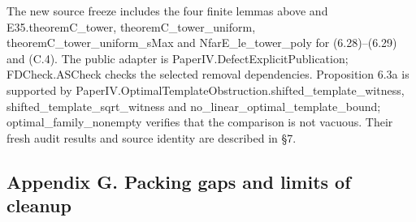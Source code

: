 \documentclass[english,11pt,a4paper]{article}
\newcounter{none}
\begin{document}
The new source freeze includes the four finite lemmas above and {\ttfamily\small E35.\discretionary{\hbox{\ensuremath{\hookrightarrow}}}{}{}theoremC\_\discretionary{\hbox{\ensuremath{\hookrightarrow}}}{}{}tower}, {\ttfamily\small theoremC\_\discretionary{\hbox{\ensuremath{\hookrightarrow}}}{}{}tower\_\discretionary{\hbox{\ensuremath{\hookrightarrow}}}{}{}uniform}, {\ttfamily\small theoremC\_\discretionary{\hbox{\ensuremath{\hookrightarrow}}}{}{}tower\_\discretionary{\hbox{\ensuremath{\hookrightarrow}}}{}{}uniform\_\discretionary{\hbox{\ensuremath{\hookrightarrow}}}{}{}sMax} and {\ttfamily\small NfarE\_\discretionary{\hbox{\ensuremath{\hookrightarrow}}}{}{}le\_\discretionary{\hbox{\ensuremath{\hookrightarrow}}}{}{}tower\_\discretionary{\hbox{\ensuremath{\hookrightarrow}}}{}{}poly} for (6.28)--(6.29) and (C.4). The public adapter is {\ttfamily\small PaperIV.\discretionary{\hbox{\ensuremath{\hookrightarrow}}}{}{}DefectExplic\discretionary{\hbox{\ensuremath{\hookrightarrow}}}{}{}itPublicatio\discretionary{\hbox{\ensuremath{\hookrightarrow}}}{}{}n}; FDCheck.ASCheck checks the selected removal dependencies. Proposition 6.3a is supported by {\ttfamily\small PaperIV.\discretionary{\hbox{\ensuremath{\hookrightarrow}}}{}{}OptimalTempl\discretionary{\hbox{\ensuremath{\hookrightarrow}}}{}{}ateObstructi\discretionary{\hbox{\ensuremath{\hookrightarrow}}}{}{}on.\discretionary{\hbox{\ensuremath{\hookrightarrow}}}{}{}shifted\_\discretionary{\hbox{\ensuremath{\hookrightarrow}}}{}{}template\_\discretionary{\hbox{\ensuremath{\hookrightarrow}}}{}{}witness}, {\ttfamily\small shifted\_\discretionary{\hbox{\ensuremath{\hookrightarrow}}}{}{}template\_\discretionary{\hbox{\ensuremath{\hookrightarrow}}}{}{}sqrt\_\discretionary{\hbox{\ensuremath{\hookrightarrow}}}{}{}witness} and {\ttfamily\small no\_\discretionary{\hbox{\ensuremath{\hookrightarrow}}}{}{}linear\_\discretionary{\hbox{\ensuremath{\hookrightarrow}}}{}{}optimal\_\discretionary{\hbox{\ensuremath{\hookrightarrow}}}{}{}template\_\discretionary{\hbox{\ensuremath{\hookrightarrow}}}{}{}bound}; {\ttfamily\small optimal\_\discretionary{\hbox{\ensuremath{\hookrightarrow}}}{}{}family\_\discretionary{\hbox{\ensuremath{\hookrightarrow}}}{}{}nonempty} verifies that the comparison is not vacuous. Their fresh audit results and source identity are described in §7.

\subsection{Appendix G. Packing gaps and limits of cleanup}\label{appendix-g.-packing-gaps-and-limits-of-cleanup}
\end{document}
